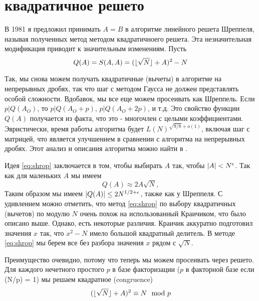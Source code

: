 \documentclass[russian, utf8, a4paper,12pt]{report}
\DeclarePairedDelimiter\floor{\lfloor}{\rfloor}
\DeclarePairedDelimiter\abs{\lvert}{\rvert}%
\begin{document}
\section{квадратичное решето}

В 1981 я предложил принимать $A = B$ в алгоритме линейного решета Шреппеля, называя полученных метод методом квадратичноего решета. Эта незначительная модификация приводит к значительным изменениям. Пусть
\begin{equation}\label{eq:shrop}
Q(A) = S(A,A) = (\floor{\sqrt{N}} + A)^2 -N
\end{equation}

Так, мы снова можем получать квадратичные (вычеты) в алгоритме на непрерывных дробях, так что шаг с методом Гаусса не должен представлять особой сложности. Вдобавок, мы все еще можем просеивать как Шреппель. Если $p | Q(A_O)$, то $p | Q(A_O + p)$, $p | Q(A_O + 2p)$, и т.д. Это свойство функции $Q(A)$ получается из факта, что это - многочлен с целыми коэффициентами. Эвристически, время работы алгоритма будет $L(N)^{\sqrt{9/8} + o(1)}$, включая шаг с матрицей, что является улучшением в сравнении с алгоритма на непрерывных дробях. Этот анализ и описания алгоритма можно найти в \cite{pomer}.

Идея \eqref{eq:shrop} заключается в том, чтобы выбирать $A$ так, чтобы $\abs{A} < N^{\epsilon}$. Так как для маленьких $A$ мы имеем
\begin{equation*}
Q(A) \approx 2A\sqrt{N},
\end{equation*}
Таким образом мы имеем $\abs{Q(A)} \leq 2N^{1/2 + \epsilon}$, также как у Шреппеля. С удивлением можно отметить, что метод \eqref{eq:shrop} по выбору квадратичных (вычетов) по модулю $N$ очень похож на использованный Краичиком, что было описано выше. Однако, есть некоторые различия. Краичик аккуратно подготовил значения $x$ так, что $x^2 - N$ имело большой квадратный делитель. В методе \eqref{eq:shrop} мы берем все без разбора значения $x$ рядом с $\sqrt{N}$.

Преимущество очевидно, потому что теперь мы можем просеивать через решето. Для каждого нечетного простого $p$ в базе факторизации ($p$ в факторной базе если (N/p) = 1) мы решаем квадратное (congruence)
\begin{equation*}
(\floor{\sqrt{N}} +A)^2 \equiv N \mod p
\end{equation*}
\end{document}
